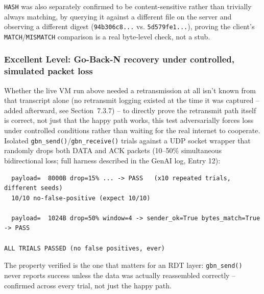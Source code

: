 \documentclass[11pt]{article}
\begin{document}
\texttt{HASH} was also separately confirmed to be content-sensitive rather than
trivially always matching, by querying it against a different file on the
server and observing a different digest (\texttt{94b306c8...} vs.
\texttt{5d579fe1...}), proving the client's \texttt{MATCH}/\texttt{MISMATCH}
comparison is a real byte-level check, not a stub.

\subsubsection{Excellent Level: Go-Back-N recovery under controlled, simulated packet loss}
Whether the live VM run above needed a retransmission at all isn't known from
that transcript alone (no retransmit logging existed at the time it was
captured -- added afterward, see Section~7.3.7) -- to directly prove the
retransmit path itself is correct, not just that the happy path works, this
test adversarially forces loss under controlled conditions rather than waiting
for the real internet to cooperate. Isolated \texttt{gbn\_send()}/\texttt{gbn\_receive()}
trials against a UDP socket
wrapper that randomly drops both DATA and ACK packets (10--50\% simultaneous
bidirectional loss; full harness described in the GenAI log, Entry 12):
\begin{lstlisting}
  payload=  8000B drop=15% ... -> PASS   (x10 repeated trials, different seeds)
  10/10 no-false-positive (expect 10/10)

  payload=  1024B drop=50% window=4 -> sender_ok=True bytes_match=True -> PASS

ALL TRIALS PASSED (no false positives, ever)
\end{lstlisting}
The property verified is the one that matters for an RDT layer: \texttt{gbn\_send()}
never reports success unless the data was actually reassembled correctly --
confirmed across every trial, not just the happy path.
\end{document}
